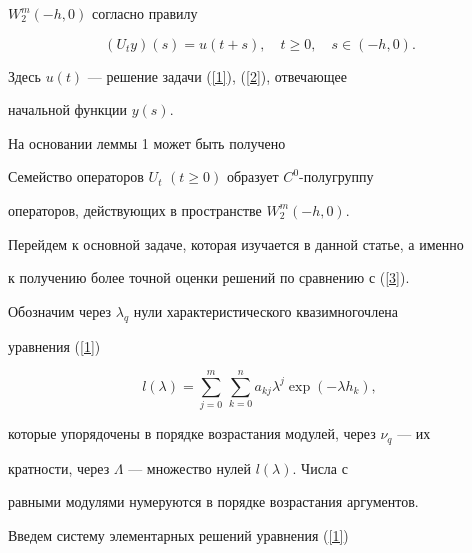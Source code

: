 $W^m_2(-h,0)$ согласно правилу 


\begin{equation} 


\label{4} 


(U_t y)(s)=u(t+s),\quad t\ge 0,\quad s\in(-h,0). 


\end{equation} 


Здесь $u(t)$ --- решение задачи (\ref{1}), (\ref{2}), отвечающее 


начальной функции $y(s)$. 


 


На основании леммы 1 может быть получено 


 


\begin{prop} 


Семейство операторов $U_t$ $(t\ge 0)$ образует $C^0$-полугруппу 


операторов, действующих в пространстве $W^m_2(-h,0)$. 


\end{prop} 


 


Перейдем к основной задаче, которая изучается в данной статье, а именно 


к получению более точной оценки решений по сравнению с (\ref{3}). 


 


Обозначим через $\lambda_q$ нули характеристического квазимногочлена 


уравнения (\ref{1}) 


\begin{equation} 


\label{5} 


l(\lambda)=\sum^m_{j=0}\,\sum^n_{k=0}a_{kj}\lambda^j\exp(-\lambda h_k), 


\end{equation} 


которые упорядочены в порядке возрастания модулей, через $\nu_q$ --- их 


кратности, через $\Lambda$ --- множество нулей $l(\lambda)$. Числа с 


равными модулями нумеруются в порядке возрастания аргументов. 


 


Введем систему элементарных решений уравнения (\ref{1}) 


